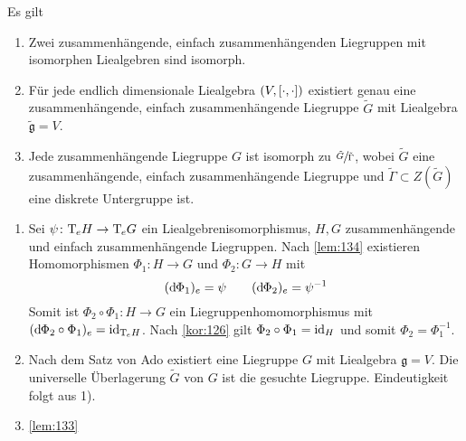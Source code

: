 \begin{satz}
	Es gilt
	\begin{enumerate}[1)]
		\item Zwei zusammenhängende, einfach zusammenhängenden Liegruppen mit isomorphen Liealgebren sind isomorph.
		\item Für jede endlich dimensionale Liealgebra $(V, \benbrace*{\cdot,\cdot })$ existiert genau eine zusammenhängende, einfach zusammenhängende Liegruppe $\tilde{G}$ mit Liealgebra $\tilde{\mathfrak{g}}=V$.
		\item Jede zusammenhängende Liegruppe $G$ ist isomorph zu $\sfrac{\tilde{G}}{\tilde{\Gamma}}$, wobei $\tilde{G}$ eine zusammenhängende, einfach zusammenhängende Liegruppe und $\tilde{\Gamma} \subset Z(\tilde{G})$ eine diskrete Untergruppe ist.
	\end{enumerate}
\end{satz}
\begin{beweis}
	\begin{enumerate}[1)]
		\item Sei $\psi \colon \Tmap_e H \to \Tmap_e G$ ein Liealgebrenisomorphismus, $H,G$ zusammenhängende und einfach zusammenhängende Liegruppen.
		Nach \autoref{lem:134} existieren Homomorphismen $\Phi_1 \colon H \to G$ und $\Phi_2 \colon G \to H$ mit
		\[
			(\mathd \Phi_1)_e = \psi \qquad (\mathd \Phi_2)_e = \psi^{-1}
		\]
		Somit ist $\Phi_2 \circ  \Phi_1 \colon H \to G$ ein Liegruppenhomomorphismus mit $(\mathd \Phi_2 \circ \Phi_1)_e = \id_{\Tmap_e H}$.
		Nach \autoref{kor:126} gilt $\Phi_2 \circ \Phi_1= \id_H$ und somit $\Phi_2 = \Phi_1^{-1}$.
		\item Nach dem Satz von Ado existiert eine Liegruppe $G$ mit Liealgebra $\mathfrak{g}=V$.
		Die universelle Überlagerung $\tilde{G}$ von $G$ ist die gesuchte Liegruppe.
		Eindeutigkeit folgt aus 1).
		\item \autoref{lem:133}\qedhere
	\end{enumerate}
\end{beweis}

